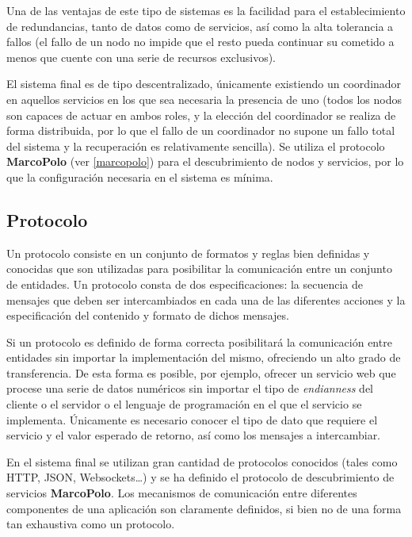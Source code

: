 Una de las ventajas de este tipo de sistemas es la facilidad para el establecimiento de redundancias, tanto de datos como de servicios, así como la alta tolerancia a fallos (el fallo de un nodo no impide que el resto pueda continuar su cometido a menos que cuente con una serie de recursos exclusivos).



El sistema final es de tipo descentralizado, únicamente existiendo un coordinador en aquellos servicios en los que sea necesaria la presencia de uno (todos los nodos son capaces de actuar en ambos roles, y la elección del coordinador se realiza de forma distribuida, por lo que el fallo de un coordinador no supone un fallo total del sistema y la recuperación es relativamente sencilla). Se utiliza el protocolo \textbf{MarcoPolo} (ver \ref{marcopolo}) para el descubrimiento de nodos y servicios, por lo que la configuración necesaria en el sistema es mínima.



\subsection{Protocolo}

Un protocolo consiste en un conjunto de formatos y reglas bien definidas y conocidas que son utilizadas para posibilitar la comunicación entre un conjunto de entidades. Un protocolo consta de dos especificaciones: la secuencia de mensajes que deben ser intercambiados en cada una de las diferentes acciones y la especificación del contenido y formato de dichos mensajes.

Si un protocolo es definido de forma correcta posibilitará la comunicación entre entidades sin importar la implementación del mismo, ofreciendo un alto grado de transferencia. De esta forma es posible, por ejemplo, ofrecer un servicio web que procese una serie de datos numéricos sin importar el tipo de \textit{endianness} del cliente o el servidor o el lenguaje de programación en el que el servicio se implementa. Únicamente es necesario conocer el tipo de dato que requiere el servicio y el valor esperado de retorno, así como los mensajes a intercambiar.

En el sistema final se utilizan gran cantidad de protocolos conocidos (tales como HTTP, JSON, Websockets\dots) y se ha definido el protocolo de descubrimiento de servicios \textbf{MarcoPolo}. Los mecanismos de comunicación entre diferentes componentes de una aplicación son claramente definidos, si bien no de una forma tan exhaustiva como un protocolo.

